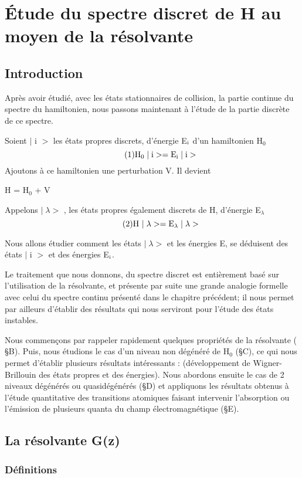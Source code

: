 \chapter{Étude du spectre discret de H au moyen de la résolvante}
\section{Introduction}
Après avoir étudié, avec les états stationnaires de collision, la
partie continue du spectre du hamiltonien, nous passons maintenant à l'étude
de la partie discrète de ce spectre.

Soient $|$ i $>$ les états propres discrets, d'énergie E$_{\text{i}}$ d'un hamiltonien H$_0$
\[
\tag{1}\text{H}_0\;|\;\text{i}>=\text{E}_{\text{i}}\;|\;\text{i}>
\]
Ajoutons à ce hamiltonien une perturbation V. Il devient
\begin{center}
H = H$_0$ + V
\end{center}
Appelons $|\;\lambda>$ , les états propres également discrets de H, d'énergie E$_\lambda$
\[
\tag{2}\text{H }|\;\lambda>=\text{E}_\lambda\;|\;\lambda>
\]

Nous allons étudier comment les états $|\;\lambda>$ et les énergies E, se déduisent des
états $|$ i $>$ et des énergies E$_{\text{i}}$.

Le traitement que nous donnons, du spectre discret est entièrement basé
sur l'utilisation de la résolvante, et présente par suite une grande analogie formelle
avec celui du spectre continu présenté dans le chapitre précédent; il nous
permet par ailleurs d'établir des résultats qui nous serviront pour l'étude des
états instables.

Nous commençons par rappeler rapidement quelques propriétés de la résolvante ( \S B). Puis,
nous étudions le cas d'un niveau non dégénéré de H$_0$ (\S C), ce qui
nous permet d'établir plusieurs résultats intéressants : (développement de Wigner-Brillouin
des états propres et des énergies). Nous abordons ensuite le cas de 2
niveaux dégénérés ou quasidégénérés (\S D) et appliquons les résultats obtenus à
l'étude quantitative des transitions atomiques faisant intervenir l'absorption ou
l'émission de plusieurs quanta du champ électromagnétique (\S E).

\section{La résolvante G(z)}%
\subsection{Définitions}%

